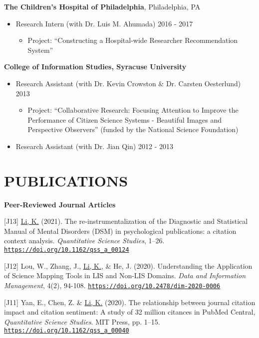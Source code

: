 \documentclass[margin, 10pt]{res} %
\begin{document}
\begin{resume}
\textbf{The Children's Hospital of Philadelphia}, Philadelphia, PA\\
\begin{itemize}
     \item Research Intern (with Dr. Luis M. Ahumada) \hfill 2016 - 2017
     \begin{itemize}
     	\item  Project: “Constructing a Hospital-wide Researcher Recommendation System”
   	\end{itemize}
\end{itemize}

\textbf{College of Information Studies, Syracuse University}\\
\begin{itemize}
	\item Research Assistant (with Dr. Kevin Crowston \& Dr. Carsten Oesterlund) \hfill 2013
    \begin{itemize}
     	\item Project: “Collaborative Research: Focusing Attention to Improve the Performance of Citizen Science Systems - Beautiful Images and Perspective Observers” (funded by the National Science Foundation)
    \end{itemize}
    \item Research Assistant (with Dr. Jian Qin) \hfill 2012 - 2013
\end{itemize}

\section{PUBLICATIONS}

\textbf{Peer-Reviewed Journal Articles}

[J13] \underline{Li, K.} (2021). The re-instrumentalization of the Diagnostic and Statistical Manual of Mental Disorders (DSM) in psychological publications: a citation context analysis. \textit{Quantitative Science Studies}, 1–26. \href{https://doi.org/10.1162/qss_a_00124}{\nolinkurl{https://doi.org/10.1162/qss_a_00124}}

[J12] Lou, W., Zhang, J., \underline{Li, K.}, \& He, J. (2020). Understanding the Application of Science Mapping Tools in LIS and Non-LIS Domains. \textit{Data and Information Management}, 4(2), 94-108. \href{https://doi.org/10.2478/dim-2020-0006}{\nolinkurl{https://doi.org/10.2478/dim-2020-0006}}

[J11] Yan, E., Chen, Z. \& \underline{Li, K.} (2020). The relationship between journal citation impact and citation sentiment: A study of 32 million citances in PubMed Central, \textit{Quantitative Science Studies}. MIT Press, pp. 1–15. \href{https://doi.org/10.1162/qss_a_00040}{\nolinkurl{https://doi.org/10.1162/qss\_a\_00040}}


\end{resume}
\end{document}
